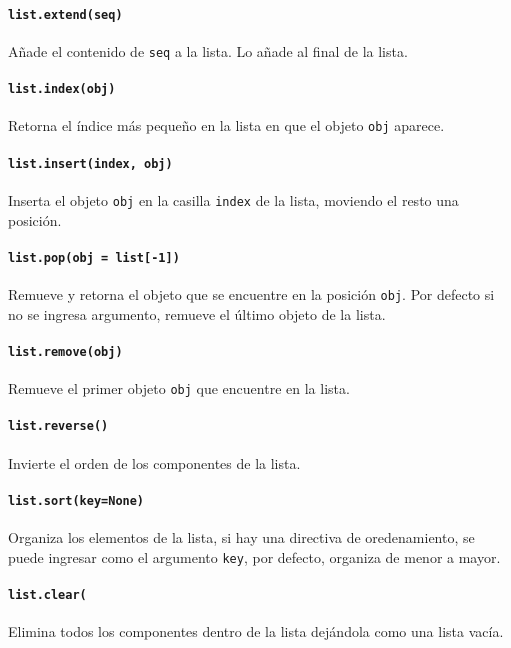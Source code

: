 \paragraph{\texttt{list.extend(seq)}} Añade el contenido de \texttt{seq} a la
lista. Lo añade al final de la lista.

\paragraph{\texttt{list.index(obj)}} Retorna el índice más pequeño en la lista
en que el objeto \texttt{obj} aparece.

\paragraph{\texttt{list.insert(index, obj)}} Inserta el objeto \texttt{obj} en
la casilla \texttt{index} de la lista, moviendo el resto una posición.

\paragraph{\texttt{list.pop(obj = list[-1])}} Remueve y retorna el objeto que
se encuentre en la posición \texttt{obj}. Por defecto si no se ingresa
argumento, remueve el último objeto de la lista.

\paragraph{\texttt{list.remove(obj)}} Remueve el primer objeto \texttt{obj} que
encuentre en la lista.

\paragraph{\texttt{list.reverse()}} Invierte el orden de los componentes de la
lista.

\paragraph{\texttt{list.sort(key=None)}} Organiza los elementos de la lista, si
hay una directiva de oredenamiento, se puede ingresar como el argumento
\texttt{key}, por defecto, organiza de menor a mayor.

\paragraph{\texttt{list.clear(}} Elimina todos los componentes dentro de la
lista dejándola como una lista vacía.

